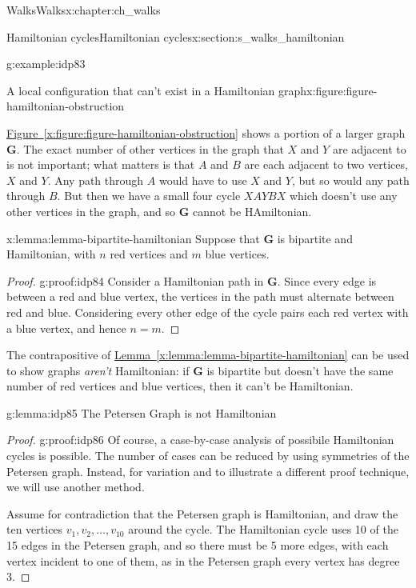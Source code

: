 \documentclass[oneside,10pt,]{book}
\newcommand{\xreffont}{\relax}
\numberwithin{equation}{section}
\newcommand{\bfG}{\mathbf{G}}
\begin{document}
\begin{chapterptx}{Walks}{}{Walks}{}{}{x:chapter:ch_walks}
\begin{sectionptx}{Hamiltonian cycles}{}{Hamiltonian cycles}{}{}{x:section:s_walks_hamiltonian}
\begin{example}{}{g:example:idp83}
\begin{figureptx}{A local configuration that can't exist in a Hamiltonian graph}{x:figure:figure-hamiltonian-obstruction}{}
\begin{image}{0.15}{0.7}{0.15}
{\begin{tikzpicture}
\end{tikzpicture}
}%
\end{image}%
\tcblower
\end{figureptx}%
\hyperref[x:figure:figure-hamiltonian-obstruction]{Figure~{\xreffont\ref{x:figure:figure-hamiltonian-obstruction}}} shows a portion of a larger graph \(\bfG\).  The exact number of other vertices in the graph that \(X\) and \(Y\) are adjacent to is not important; what matters is that \(A\) and \(B\) are each adjacent to two vertices, \(X\) and \(Y\).  Any path through \(A\) would have to use \(X\) and \(Y\), but so would any path through \(B\).  But then we have a small four cycle \(XAYBX\) which doesn't use any other vertices in the graph, and so \(\bfG\) cannot be HAmiltonian.%
\end{example}
\begin{lemma}{}{}{x:lemma:lemma-bipartite-hamiltonian}%
Suppose that \(\bfG\) is bipartite and Hamiltonian, with \(n\) red vertices and \(m\) blue vertices.%
\end{lemma}
\begin{proof}{}{g:proof:idp84}
Consider a Hamiltonian path in \(\bfG\).  Since every edge is between a red and blue vertex, the vertices in the path must alternate between red and blue.  Considering every other edge of the cycle pairs each red vertex with a blue vertex, and hence \(n=m\).%
\end{proof}
The contrapositive of \hyperref[x:lemma:lemma-bipartite-hamiltonian]{Lemma~{\xreffont\ref{x:lemma:lemma-bipartite-hamiltonian}}} can be used to show graphs \emph{aren't} Hamiltonian: if \(\bfG\) is bipartite but doesn't have the same number of red vertices and blue vertices, then it can't be Hamiltonian.%
\begin{lemma}{}{}{g:lemma:idp85}%
The Petersen Graph is not Hamiltonian%
\end{lemma}
\begin{proof}{}{g:proof:idp86}
Of course, a case-by-case analysis of possibile Hamiltonian cycles is possible.  The number of cases can be reduced by using symmetries of the Petersen graph. Instead, for variation and to illustrate a different proof technique, we will use another method.%
\par
Assume for contradiction that the Petersen graph is Hamiltonian, and draw the ten vertices \(v_1,v_2,\dots,v_{10}\) around the cycle.  The Hamiltonian cycle uses 10 of the 15 edges in the Petersen graph, and so there must be 5 more edges, with each vertex incident to one of them, as in the Petersen graph every vertex has degree 3.%

\end{proof}
\end{sectionptx}
\end{chapterptx}
\end{document}

